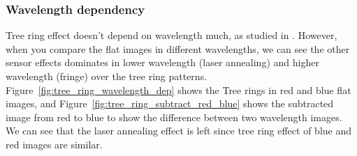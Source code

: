 \subsubsection{Wavelength dependency}
Tree ring effect doesn't depend on wavelength much, as studied in \citep{2017Jinst..12C05015, 10.1117/1.JATIS.6.1.011005}. However, when you compare the flat images in different wavelengths, we can see the other sensor effects dominates in lower wavelength (laser annealing) and higher wavelength (fringe) over the tree ring patterns. Figure~\ref{fig:tree_ring_wavelength_dep} shows the Tree rings in red and blue flat images, and Figure~\ref{fig:tree_ring_subtract_red_blue} shows the subtracted image from red to blue to show the difference between two wavelength images. We can see that the laser annealing effect is left since tree ring effect of blue and red images are similar. 


